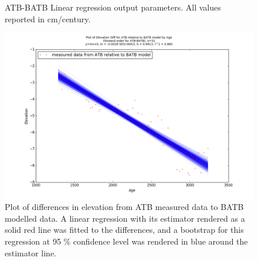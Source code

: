 \begin{figure}[H]
	\begin{flushleft}
	\end{flushleft}
	\caption{ATB-BATB Linear regression output parameters. All values reported in cm/century.}
	\label{fig:ATBxBATB_regression}
\end{figure}

\newpage

\begin{figure}[H]
	\includegraphics[width=1.3\linewidth, angle=270 ]{data/bothNonZero/withinSeventyFivePercent/gias/theGIA_ATB_relative_to_BATB.png}
	\caption{Plot of differences in elevation from ATB measured data to BATB modelled data. A linear regression with its estimator rendered as
	 a solid red line was fitted to the differences, and a bootstrap for this regression at 95 \% confidence level was rendered in blue
	 around the estimator line.}
	\label{fig:gias_ATBxBATB}
\end{figure}


